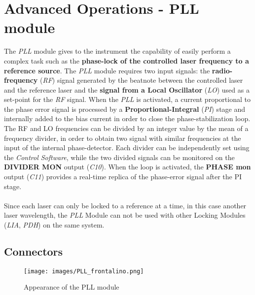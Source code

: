 \section{Advanced Operations - PLL module}   \label{PLL_main_chapter}
The \textit{PLL} module gives to the \QubeModel  instrument the capability of easily perform a complex task such as the \textbf{phase-lock of the controlled laser frequency to a reference source}. The \textit{PLL} module requires two input signals: the \textbf{radio-frequency} (\textit{RF}) signal generated by the beatnote between the controlled laser and the reference laser and the \textbf{signal from a Local Oscillator} (\textit{LO}) used as a set-point for the \textit{RF} signal. 
\newline When the \textit{PLL} is activated, a current proportional to the phase error signal is processed by a \textbf{Proportional-Integral} (\textit{PI}) stage and internally added to the bias current in order to close the phase-stabilization loop. 
\newline The RF and LO frequencies can be divided by an integer value by the mean of a frequency divider, in order to obtain two signal with similar frequencies at the input of the internal phase-detector. Each divider can be independently set using the \textit{Control Software}, while the two divided signals can be monitored on the \textbf{DIVIDER MON} output (\textit{C10}). When the loop is activated, the \textbf{PHASE mon} output (\textit{C11}) provides a real-time replica of the phase-error signal after the PI stage.

\paragraph{} Since each laser can only be locked to a reference at a time, in this case another laser wavelength, the \textit{PLL} Module can not be used with other Locking Modules (\textit{LIA}, \textit{PDH}) on the same \QubeModel  system.





\subsection{Connectors} \label{PLL_connectors_chapter}
\begin{figure}[h]
    \centering
    \texttt{[image: images/PLL\_frontalino.png]}
    \caption{Appearance of the PLL module}
    \label{PLL_frontalino}
\end{figure}

